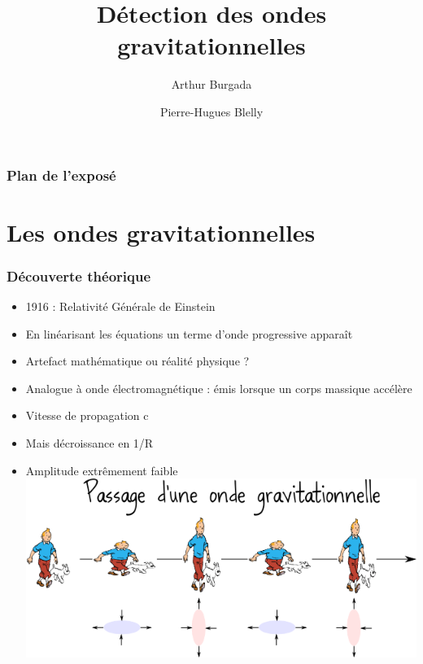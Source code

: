 \documentclass{beamer}
\date{}
\author{Arthur Burgada \and Pierre-Hugues Blelly}
\title{Détection des ondes gravitationnelles}
\begin{document}
\begin{frame}
	\titlepage
\end{frame}

\begin{frame}
	\frametitle{Plan de l'exposé}
	\tableofcontents
\end{frame}

\section{Les ondes gravitationnelles}
\begin{frame}
	\frametitle{Découverte théorique}
	\begin{itemize}
		\item 1916 : Relativité Générale de Einstein
		\item En linéarisant les équations un terme d'onde progressive apparaît
		\item Artefact mathématique ou réalité physique ?
	\end{itemize}
\end{frame}

\begin{frame}
	\begin{itemize}
		\item Analogue à onde électromagnétique : émis lorsque un corps massique accélère
		\item Vitesse de propagation c
		\item Mais décroissance en 1/R
		\item Amplitude extrêmement faible
		\bigskip
		\center\includegraphics[scale = 0.4]{Docs/tintin.png}
	\end{itemize}

\end{frame}
\end{document}
